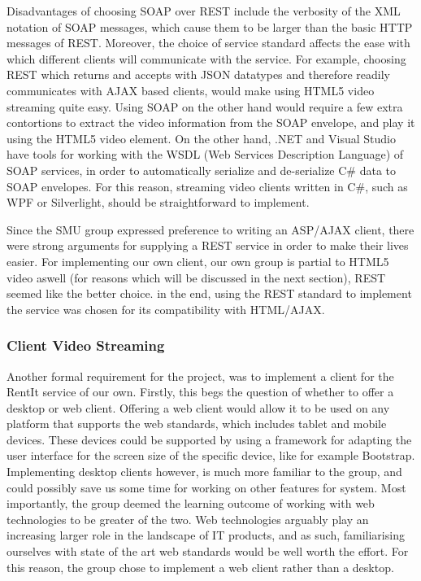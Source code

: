 Disadvantages of choosing SOAP over REST include the verbosity of the XML notation of SOAP messages, which cause them to be larger than the basic HTTP messages of REST. Moreover, the choice of service standard affects the ease with which different clients will communicate with the service. For example, choosing REST which returns and accepts with JSON datatypes and therefore readily communicates with AJAX based clients, would make using  HTML5 video streaming quite easy. Using SOAP on the other hand would require a few extra contortions to extract the video information from the SOAP envelope, and play it using the HTML5 video element. On the other hand, .NET and Visual Studio have tools for working with the WSDL (Web Services Description Language) of SOAP services, in order to automatically serialize and de-serialize C\# data to SOAP envelopes. For this reason, streaming video clients written in C\#, such as WPF or Silverlight, should be straightforward to implement.

Since the SMU group expressed preference to writing an ASP/AJAX client, there were strong arguments for supplying a REST service in order to make their lives easier. For implementing our own client, our own group is partial to HTML5 video aswell (for reasons which will be discussed in the next section), REST seemed like the better choice. in the end, using the REST standard to implement the service was chosen for its compatibility with HTML/AJAX.

\subsubsection{Client Video Streaming}
Another formal requirement for the project, was to implement a client for the RentIt service of our own. Firstly, this begs the question of whether to offer a desktop or web client. Offering a web client would allow it to be used on any platform that supports the web standards, which includes tablet and mobile devices. These devices could be supported by using a framework for adapting the user interface for the screen size of the specific device, like for example Bootstrap. Implementing desktop clients however, is much more familiar to the group, and could possibly save us some time for working on other features for system. Most importantly, the group deemed the learning 	outcome of working with web technologies to be greater of the two. Web technologies arguably play an increasing larger role in the landscape of IT products, and as such, familiarising ourselves with state of the art web standards would be well worth the effort. For this reason, the group chose to implement a web client rather than a desktop.


